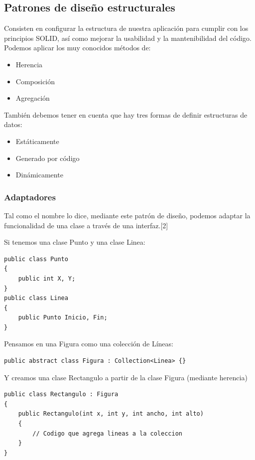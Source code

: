 \documentclass[twoside,twocolumn]{article}
\begin{document}
\subsection{Patrones de diseño estructurales}

Consisten en configurar la estructura de nuestra aplicación para cumplir con los principios SOLID, así como mejorar la usabilidad y la mantenibilidad del código. Podemos aplicar los muy conocidos métodos de:

\begin{itemize}
\item Herencia
\item Composición
\item Agregación
\end{itemize}

También debemos tener en cuenta que hay tres formas de definir estructuras de datos:

\begin{itemize}
\item Estáticamente
\item Generado por código
\item Dinámicamente
\end{itemize}

\subsubsection{Adaptadores}

Tal como el nombre lo dice, mediante este patrón de diseño, podemos adaptar la funcionalidad de una clase a través de una interfaz.[2]

Si tenemos una clase Punto y una clase Linea:
\lstset{breaklines=true,style=sharpc}
\begin{lstlisting}
public class Punto
{
    public int X, Y;
}
public class Linea
{
    public Punto Inicio, Fin;
}
\end{lstlisting}

Pensamos en una Figura como una colección de Líneas:
\lstset{breaklines=true,style=sharpc}
\begin{lstlisting}
public abstract class Figura : Collection<Linea> {}
\end{lstlisting}

Y creamos una clase Rectangulo a partir de la clase Figura (mediante herencia)
\lstset{breaklines=true,style=sharpc}
\begin{lstlisting}
public class Rectangulo : Figura
{
    public Rectangulo(int x, int y, int ancho, int alto)
    {
        // Codigo que agrega lineas a la coleccion
    }
}
\end{lstlisting}
\end{document}

